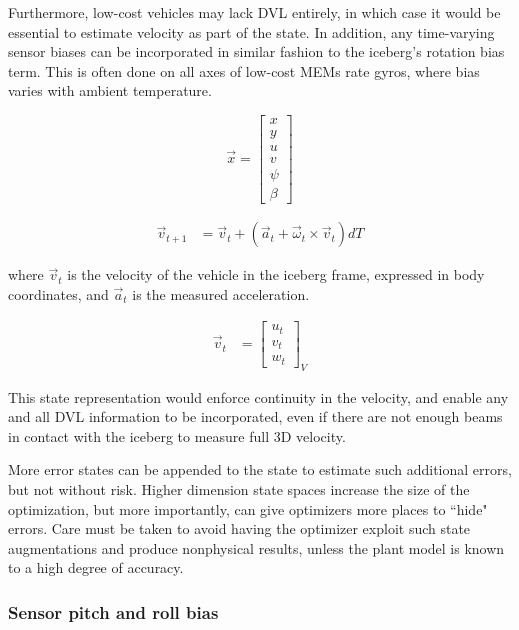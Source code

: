 Furthermore, low-cost vehicles may lack DVL entirely, in which case it would be essential to estimate velocity as part of the state. In addition, any time-varying sensor biases can be incorporated in similar fashion to the iceberg's rotation bias term. This is often done on all axes of low-cost MEMs rate gyros, where bias varies with ambient temperature. 

\begin{equation}
\label{eq.altState}
\vec{x}= \left[\begin{array}{c}
                     x \\ y \\ u \\ v \\ \psi \\ \beta 
                     \end{array}\right]
\end{equation}

\begin{align}
\vec{v}_{t+1} &= \vec{v}_t + \left( \vec{a}_t + \vec{\omega}_t \times \vec{v}_t \right)dT
\end{align}

\noindent where $\vec{v}_t$ is the velocity of the vehicle in the iceberg frame, expressed in body coordinates, and $\vec{a}_t$ is the measured acceleration.
 
\begin{align}
\vec{v}_{t} &=  \left[\begin{array}{c}
                     u_t \\ v_t \\ w_t
                     \end{array}\right]_V
\end{align}

This state representation would enforce continuity in the velocity, and enable any and all DVL information to be incorporated, even if there are not enough beams in contact with the iceberg to measure full 3D velocity.

More error states can be appended to the state to estimate such additional errors, but not without risk. Higher dimension state spaces increase the size of the optimization, but more importantly, can give optimizers more places to ``hide" errors. Care must be taken to avoid having the optimizer exploit such state augmentations and produce nonphysical results, unless the plant model is known to a high degree of accuracy.

\subsubsection{Sensor pitch and roll bias}

